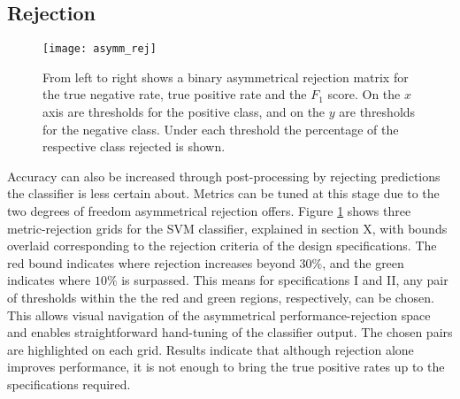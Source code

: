     \subsection{Rejection}
    \label{subsec:exp-postproc-rej}
        \begin{figure}[ht]
            \centering
            \texttt{[image: asymm\_rej]}
            \caption{From left to right shows a binary asymmetrical rejection matrix for the true negative rate, true positive rate and the $F_1$ score. On the $x$ axis are thresholds for the positive class, and on the $y$ are thresholds for the negative class. Under each threshold the percentage of the respective class rejected is shown.}
            \label{fig:exp-postproc-asymrej}
        \end{figure}
        Accuracy can also be increased through post-processing by rejecting predictions the classifier is less certain about. Metrics can be tuned at this stage due to the two degrees of freedom asymmetrical rejection offers. Figure \ref{fig:exp-postproc-asymrej} shows three metric-rejection grids for the SVM classifier, explained in section X, with bounds overlaid corresponding to the rejection criteria of the design specifications. The red bound indicates where rejection increases beyond $30\%$, and the green indicates where $10\%$ is surpassed. This means for specifications I and II, any pair of thresholds within the the red and green regions, respectively, can be chosen. This allows visual navigation of the asymmetrical performance-rejection space and enables straightforward hand-tuning of the classifier output. The chosen pairs are highlighted on each grid. Results indicate that although rejection alone improves performance, it is not enough to bring the true positive rates up to the specifications required.
    
